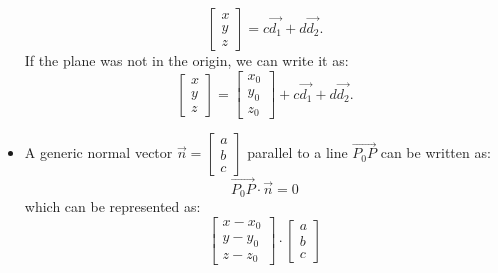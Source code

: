 \begin{itemize}
    \begin{equation}
        \begin{bmatrix}
            x\\y\\z
        \end{bmatrix} = c\vec{d_1} + d\vec{d_2}.
    \end{equation}
    If the plane was not in the origin, we can write it as:
    \begin{equation}
        \begin{bmatrix}
            x\\y\\z
        \end{bmatrix} = \begin{bmatrix}
            x_0\\y_0\\z_0
        \end{bmatrix} + c\vec{d_1} + d\vec{d_2}.
    \end{equation}
    \item A generic normal vector $\vec{n}=\begin{bmatrix}
        a\\b\\c
    \end{bmatrix}$ parallel to a line $\overrightarrow{P_0P}$ can be written as:
    \begin{equation}
        \overrightarrow{P_0P} \cdot \vec{n} = 0
        \label{eq:}
    \end{equation}
    which can be represented as:
    \begin{equation}
        \begin{bmatrix}
            x-x_0\\y-y_0\\z-z_0
        \end{bmatrix} \cdot \begin{bmatrix}
            a\\b\\c
        \end{bmatrix}
    \end{equation}
\end{itemize}